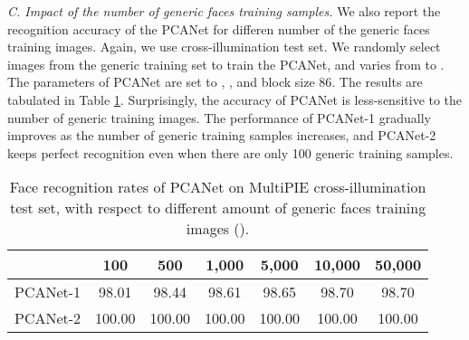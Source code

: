 \documentclass[10pt,journal,compsoc]{IEEEtran}
\begin{document}
\begin{figure*}[t]
\centering
{}
\quad \quad \quad \quad
{}\hspace{0cm}
\hspace{0cm}

\caption{Recognition rate of PCANet on MultiPIE cross-illumination test set, for different PCANet block size and deformation to the test image. Two block sizes [8 6] and [12 9] for histogram aggregation are tested. (a) Simultaneous translation in  and  directions. (b) Translation in  direction. (c) Translation in  direction. (d) In-plane rotation. (e) Scale variation. }\label{fig: MultiPIE_misalignment}
\end{figure*}

\vspace{0.3\baselineskip}
{\em C. Impact of the number of generic faces training samples.} We also report the recognition accuracy of the PCANet for differen number of the generic faces training images. Again, we use cross-illumination test set. We randomly select  images from the generic training set to train the PCANet, and varies  from  to . The parameters of PCANet are set to , , and block size 86. The results are tabulated in Table \ref{table: MultiPIE_generic_training}. Surprisingly, the accuracy of PCANet is less-sensitive to the number of generic training images. The performance of PCANet-1 gradually improves as the number of generic training samples increases, and PCANet-2 keeps perfect recognition even when there are only 100 generic training samples.

\begin{table}\centering
\caption{Face recognition rates  of PCANet on MultiPIE cross-illumination test set, with respect to different amount of generic faces training images (). }
\vspace{0.1cm}\begin{tabular}{c|c|c|c|c|c|c}
  \hline
 & 100 & 500 & 1,000 & 5,000 & 10,000 & 50,000  \\ \hline \hline
  PCANet-1   & 98.01 & 98.44 & 98.61 & 98.65 & 98.70 & 98.70  \\
  PCANet-2   & 100.00 & 100.00 & 100.00 & 100.00 & 100.00 & 100.00 \\
  \hline
\end{tabular}\label{table: MultiPIE_generic_training}
\end{table}
\end{document}
